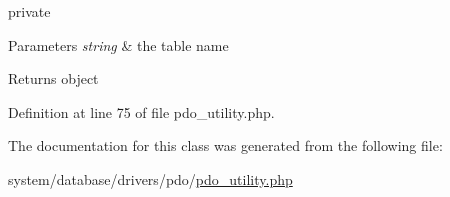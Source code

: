 private 
\begin{DoxyParams}{Parameters}
{\em string} & the table name \\
\hline
\end{DoxyParams}
\begin{DoxyReturn}{Returns}
object 
\end{DoxyReturn}


Definition at line 75 of file pdo\-\_\-utility.\-php.



The documentation for this class was generated from the following file\-:\begin{DoxyCompactItemize}
\item 
system/database/drivers/pdo/\hyperlink{pdo__utility_8php}{pdo\-\_\-utility.\-php}\end{DoxyCompactItemize}
